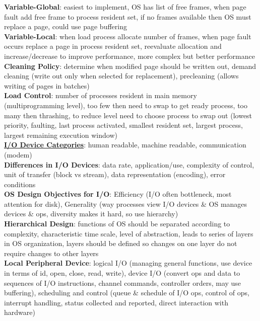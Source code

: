 \documentclass[a4paper]{article}
\begin{document}
\begin{multicols}{2}
        \textbf{Variable-Global}: easiest to implement, OS has list of free frames, when page fault add free frame to process resident set, if no frames available then OS must replace a page, could use page buffering\\
        \textbf{Variable-Local}: when load process allocate number of frames, when page fault occurs replace a page in process resident set, reevaluate allocation and increase/decrease to improve performance, more complex but better performance\\
        \textbf{Cleaning Policy}: determine when modified page should be written out, demand cleaning (write out only when selected for replacement), precleaning (allows writing of pages in batches)\\
        \textbf{Load Control}: number of processes resident in main memory (multiprogramming level), too few then need to swap to get ready process, too many then thrashing, to reduce level need to choose process to swap out (lowest priority, faulting, last process activated, smallest resident set, largest process, largest remaining execution window)\\
        \underline{\textbf{I/O Device Categories}}: human readable, machine readable, communication (modem)\\
        \textbf{Differences in I/O Devices}: data rate, application/use, complexity of control, unit of transfer (block vs stream), data representation (encoding), error conditions\\
        \textbf{OS Design Objectives for I/O}: Efficiency (I/O often bottleneck, most attention for disk), Generality (way processes view I/O devices \& OS manages devices \& ops, diversity makes it hard, so use hierarchy)\\
        \textbf{Hierarchical Design}: functions of OS should be separated according to complexity, characteristic time scale, level of abstraction, leads to series of layers in OS organization, layers should be defined so changes on one layer do not require changes to other layers\\
        \textbf{Local Peripheral Device}: logical I/O (managing general functions, use device in terms of id, open, close, read, write), device I/O (convert ops and data to sequences of I/O instructions, channel commands, controller orders, may use buffering), scheduling and control (queue \& schedule of I/O ops, control of ops, interrupt handling, status collected and reported, direct interaction with hardware)\\

\end{multicols}
\end{document}
